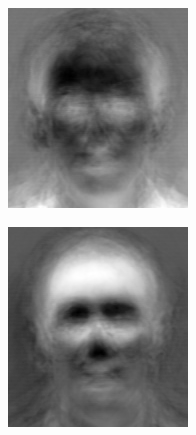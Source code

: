 \begin{figure}
\begin{subfigure}[b]{0.3\textwidth}
\includegraphics[width=\textwidth]{eigenface0.png}
\end{subfigure}
\begin{subfigure}[b]{0.3\textwidth}
\includegraphics[width=\textwidth]{eigenface1.png}

\end{subfigure}
\end{figure}
